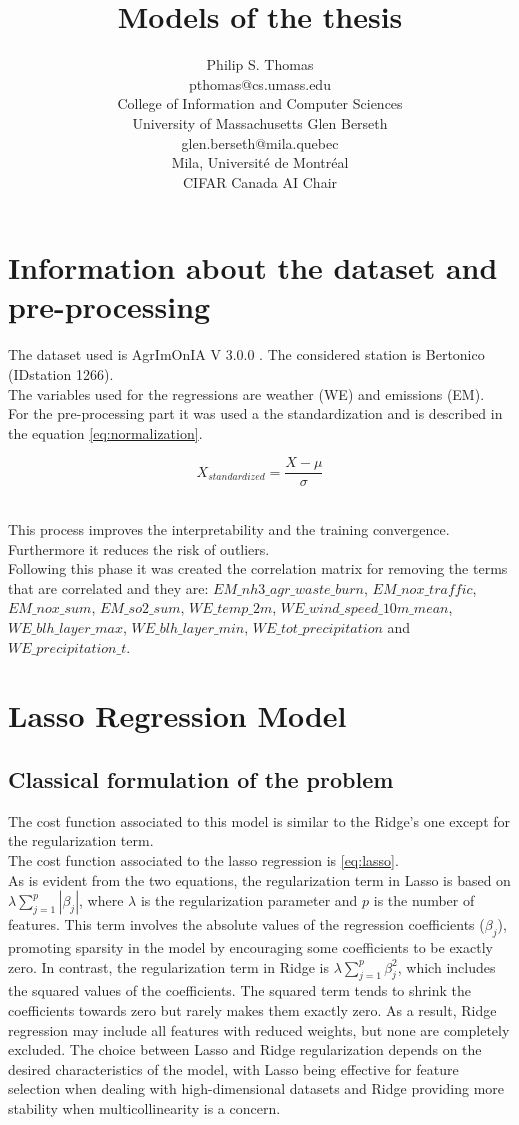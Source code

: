 \documentclass[10pt]{article} %
\title{Models of the thesis}
\author{Philip S. Thomas  \\
    pthomas@cs.umass.edu \\
    College of Information and Computer Sciences\\
    University of Massachusetts
    \And
    Glen Berseth \\
    glen.berseth@mila.quebec\\
    Mila, Universit\'e de Montr\'eal \\
    CIFAR Canada AI Chair}
\begin{document}
    
    \section{Information about the dataset and pre-processing}
    The dataset used is AgrImOnIA V 3.0.0 \cite{lmwebsite}. The considered station is Bertonico (IDstation 1266).
    \\The variables used for the regressions are weather (WE) and emissions (EM). 
    \\For the pre-processing part it was used a the standardization and is described in the equation \ref{eq:normalization}.

    \begin{equation}
        X_{standardized} = \frac{X-\mu}{\sigma}
        \label{eq:normalization} 
    \end{equation}

    \\This process improves the interpretability and the training convergence. Furthermore it reduces the risk of outliers.
    \\Following this phase it was created the correlation matrix for removing the terms that are correlated and they are: $EM\_nh3\_agr\_waste\_burn$, $EM\_nox\_traffic$, $EM\_nox\_sum$, $EM\_so2\_sum$, $WE\_temp\_2m$, $WE\_wind\_speed\_10m\_mean$, $WE\_blh\_layer\_max$, $WE\_blh\_layer\_min$, $WE\_tot\_precipitation$ and $WE\_precipitation\_t$.
    \section{Lasso Regression Model}
    \subsection{Classical formulation of the problem}
    The cost function associated to this model is similar to the Ridge's one except for the regularization term.
    \\The cost function \cite{james2013chapter6-2-2} associated to the lasso regression is \ref{eq:lasso}.
    \\As is evident from the two equations, the regularization term in Lasso is based on \( \lambda \sum_{j=1}^p|\beta_j| \), where \( \lambda \) is the regularization parameter and \( p \) is the number of features. This term involves the absolute values of the regression coefficients (\( \beta_j \)), promoting sparsity in the model by encouraging some coefficients to be exactly zero. In contrast, the regularization term in Ridge is \( \lambda \sum_{j=1}^p \beta_j^2 \), which includes the squared values of the coefficients. The squared term tends to shrink the coefficients towards zero but rarely makes them exactly zero. As a result, Ridge regression may include all features with reduced weights, but none are completely excluded. The choice between Lasso and Ridge regularization depends on the desired characteristics of the model, with Lasso being effective for feature selection when dealing with high-dimensional datasets and Ridge providing more stability when multicollinearity is a concern.
\end{document}
